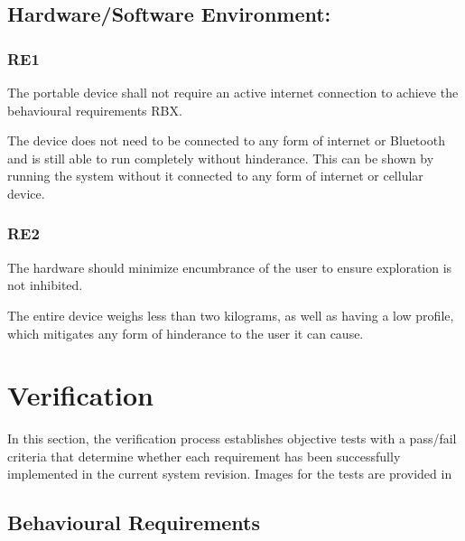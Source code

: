 \documentclass[11pt]{article}
\begin{document}
	
	\subsection{Hardware/Software Environment: }
	
	\subsubsection{RE1}  
	
	\begin{exampleblock}
		The portable device shall not require an active internet connection to achieve the behavioural requirements RBX.
	\end{exampleblock}
	
	The device does not need to be connected to any form of internet or Bluetooth and is still able to run completely without hinderance. This can be shown by running the system without it connected to any form of internet or cellular device. 
	
	\subsubsection{RE2} 
	
	\begin{exampleblock}
		The hardware should minimize encumbrance of the user to ensure exploration is not inhibited.
	\end{exampleblock}
	
	The entire device weighs less than two kilograms, as well as having a low profile, which mitigates any form of hinderance to the user it can cause.
	
	
	\section{Verification}
	
	In this section, the verification process establishes objective tests with a pass/fail criteria that determine whether each requirement has been successfully implemented in the current system revision. Images for the tests are provided in 
	
	\subsection{Behavioural Requirements} 
	
\end{document}
